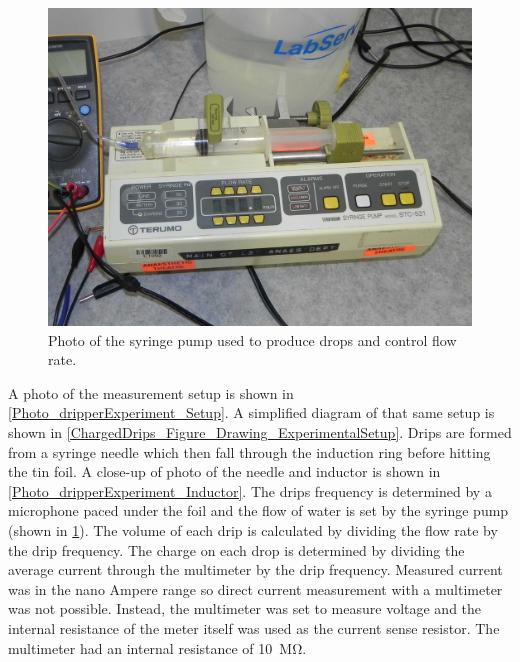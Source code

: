     \begin{figure}[ht]
        \centering
        \includegraphics[scale=0.15]{content/appendices/chargedWaterDrops/graphics/Photo_dripperExperiment_SyringePump_draft.JPG}
        \caption{\label{Photo_dripperExperiment_SyringePump}Photo of the syringe pump used to produce drops and control flow rate.}
    \end{figure}

    A photo of the measurement setup is shown in \cref{Photo_dripperExperiment_Setup}.
    A simplified diagram of that same setup is shown in \cref{ChargedDrips_Figure_Drawing_ExperimentalSetup}.
    Drips are formed from a syringe needle which then fall through the induction ring before hitting the tin foil.
    A close-up of photo of the needle and inductor is shown in \cref{Photo_dripperExperiment_Inductor}.
    The drips frequency is determined by a microphone paced under the foil and the flow of water is set by the syringe pump (shown in \cref{Photo_dripperExperiment_SyringePump}).
    The volume of each drip is calculated by dividing the flow rate by the drip frequency.
    The charge on each drop is determined by dividing the average current through the multimeter by the drip frequency.
    Measured current was in the nano Ampere range so direct current measurement with a multimeter was not possible.
    Instead, the multimeter was set to measure voltage and the internal resistance of the meter itself was used as the current sense resistor.
    The multimeter had an internal resistance of \SI{10}{\mega\ohm}.
%

